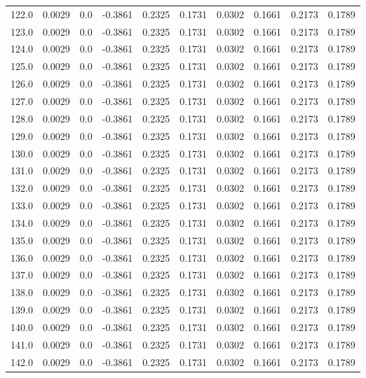 \begin{longtable}{lrrrrrrrrr}
122.0 & 0.0029 & 0.0 & -0.3861 & 0.2325 & 0.1731 & 0.0302 & 0.1661 & 0.2173 & 0.1789 \\
123.0 & 0.0029 & 0.0 & -0.3861 & 0.2325 & 0.1731 & 0.0302 & 0.1661 & 0.2173 & 0.1789 \\
124.0 & 0.0029 & 0.0 & -0.3861 & 0.2325 & 0.1731 & 0.0302 & 0.1661 & 0.2173 & 0.1789 \\
125.0 & 0.0029 & 0.0 & -0.3861 & 0.2325 & 0.1731 & 0.0302 & 0.1661 & 0.2173 & 0.1789 \\
126.0 & 0.0029 & 0.0 & -0.3861 & 0.2325 & 0.1731 & 0.0302 & 0.1661 & 0.2173 & 0.1789 \\
127.0 & 0.0029 & 0.0 & -0.3861 & 0.2325 & 0.1731 & 0.0302 & 0.1661 & 0.2173 & 0.1789 \\
128.0 & 0.0029 & 0.0 & -0.3861 & 0.2325 & 0.1731 & 0.0302 & 0.1661 & 0.2173 & 0.1789 \\
129.0 & 0.0029 & 0.0 & -0.3861 & 0.2325 & 0.1731 & 0.0302 & 0.1661 & 0.2173 & 0.1789 \\
130.0 & 0.0029 & 0.0 & -0.3861 & 0.2325 & 0.1731 & 0.0302 & 0.1661 & 0.2173 & 0.1789 \\
131.0 & 0.0029 & 0.0 & -0.3861 & 0.2325 & 0.1731 & 0.0302 & 0.1661 & 0.2173 & 0.1789 \\
132.0 & 0.0029 & 0.0 & -0.3861 & 0.2325 & 0.1731 & 0.0302 & 0.1661 & 0.2173 & 0.1789 \\
133.0 & 0.0029 & 0.0 & -0.3861 & 0.2325 & 0.1731 & 0.0302 & 0.1661 & 0.2173 & 0.1789 \\
134.0 & 0.0029 & 0.0 & -0.3861 & 0.2325 & 0.1731 & 0.0302 & 0.1661 & 0.2173 & 0.1789 \\
135.0 & 0.0029 & 0.0 & -0.3861 & 0.2325 & 0.1731 & 0.0302 & 0.1661 & 0.2173 & 0.1789 \\
136.0 & 0.0029 & 0.0 & -0.3861 & 0.2325 & 0.1731 & 0.0302 & 0.1661 & 0.2173 & 0.1789 \\
137.0 & 0.0029 & 0.0 & -0.3861 & 0.2325 & 0.1731 & 0.0302 & 0.1661 & 0.2173 & 0.1789 \\
138.0 & 0.0029 & 0.0 & -0.3861 & 0.2325 & 0.1731 & 0.0302 & 0.1661 & 0.2173 & 0.1789 \\
139.0 & 0.0029 & 0.0 & -0.3861 & 0.2325 & 0.1731 & 0.0302 & 0.1661 & 0.2173 & 0.1789 \\
140.0 & 0.0029 & 0.0 & -0.3861 & 0.2325 & 0.1731 & 0.0302 & 0.1661 & 0.2173 & 0.1789 \\
141.0 & 0.0029 & 0.0 & -0.3861 & 0.2325 & 0.1731 & 0.0302 & 0.1661 & 0.2173 & 0.1789 \\
142.0 & 0.0029 & 0.0 & -0.3861 & 0.2325 & 0.1731 & 0.0302 & 0.1661 & 0.2173 & 0.1789 \\

\end{longtable}
